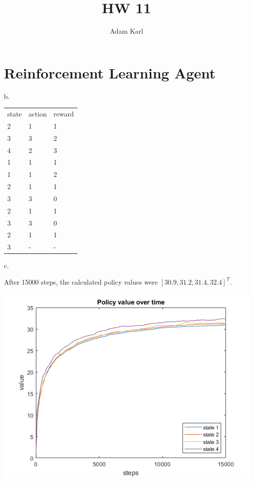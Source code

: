 \documentclass{article}
\title{HW 11}
\author{Adam Karl}
\begin{document}
\maketitle

\section{Reinforcement Learning Agent}

b.

\begin{table}[htb]
\begin{tabular}{lll}
state & action & reward \\
2     & 1      & 1      \\
3     & 3      & 2      \\
4     & 2      & 3      \\
1     & 1      & 1      \\
1     & 1      & 2      \\
2     & 1      & 1      \\
3     & 3      & 0      \\
2     & 1      & 1      \\
3     & 3      & 0      \\
2     & 1      & 1      \\
3     & -      & -     
\end{tabular}
\end{table}

\noindent 
c.

\noindent 
After 15000 steps, the calculated policy values were $[30.9,31.2,31.4,32.4]^T$.

\begin{center}
    \includegraphics[scale=1]{1c.png}
\end{center}
\end{document}

